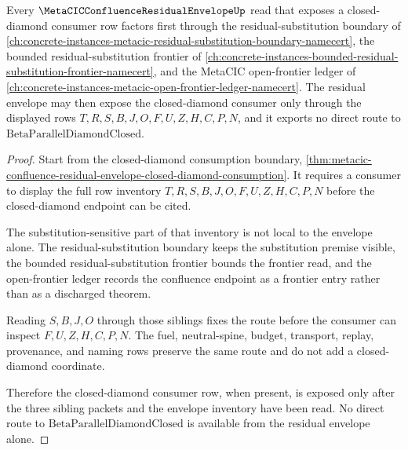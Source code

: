 \begin{theorem}
\label{thm:metacic-confluence-residual-envelope-diamond-route}
Every $\MetaCICConfluenceResidualEnvelopeUp$ read that exposes a closed-diamond consumer row factors first through the residual-substitution boundary of \autoref{ch:concrete-instances-metacic-residual-substitution-boundary-namecert}, the bounded residual-substitution frontier of \autoref{ch:concrete-instances-bounded-residual-substitution-frontier-namecert}, and the MetaCIC open-frontier ledger of \autoref{ch:concrete-instances-metacic-open-frontier-ledger-namecert}. The residual envelope may then expose the closed-diamond consumer only through the displayed rows $T,R,S,B,J,O,F,U,Z,H,C,P,N$, and it exports no direct route to $\mathrm{BetaParallelDiamondClosed}$.
\end{theorem}
\begin{proof}
Start from the closed-diamond consumption boundary,
\autoref{thm:metacic-confluence-residual-envelope-closed-diamond-consumption}.
It requires a consumer to display the full row inventory
$T,R,S,B,J,O,F,U,Z,H,C,P,N$ before the closed-diamond endpoint can be cited.

The substitution-sensitive part of that inventory is not local to the
envelope alone. The residual-substitution boundary keeps the substitution
premise visible, the bounded residual-substitution frontier bounds the
frontier read, and the open-frontier ledger records the confluence endpoint
as a frontier entry rather than as a discharged theorem.

Reading $S,B,J,O$ through those siblings fixes the route before the consumer
can inspect $F,U,Z,H,C,P,N$. The fuel, neutral-spine, budget, transport,
replay, provenance, and naming rows preserve the same route and do not add a
closed-diamond coordinate.

Therefore the closed-diamond consumer row, when present, is exposed only
after the three sibling packets and the envelope inventory have been read.
No direct route to $\mathrm{BetaParallelDiamondClosed}$ is available from the
residual envelope alone.
\end{proof}

